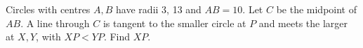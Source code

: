 Circles with centres $A,B$ have radii 3, 13 and $AB=10$. Let $C$ be the midpoint of $AB$. A line through $C$ is tangent to the smaller circle at $P$ and meets the larger at $X,Y$, with $XP<YP$. Find $XP$.
